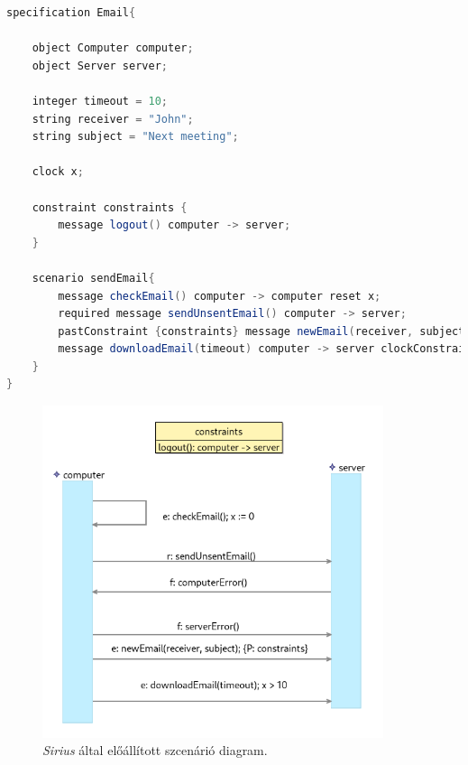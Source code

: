 \begin{lstlisting}[language=java, frame=single, float=ht!, caption={Szcenárió szöveges leírása.},captionpos=b, label=sirius_tpsc_text]
specification Email{

    object Computer computer;
    object Server server;

    integer timeout = 10;
    string receiver = "John";
    string subject = "Next meeting";

    clock x;

    constraint constraints {
        message logout() computer -> server;
    }

    scenario sendEmail{
        message checkEmail() computer -> computer reset x;
        required message sendUnsentEmail() computer -> server;
        pastConstraint {constraints} message newEmail(receiver, subject) computer -> server;
        message downloadEmail(timeout) computer -> server clockConstraint {>(x,10)};
    }
}
\end{lstlisting}

\begin{figure}[!ht]
    \centering
    \includegraphics[width=100mm, keepaspectratio]{figures/diagramExample.png}
    \caption{\textit{Sirius} által előállított szcenárió diagram.}
    \label{sirius_diagram}
\end{figure}

